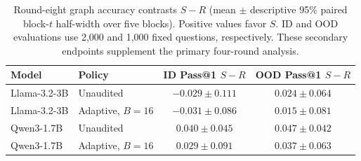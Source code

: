 \begin{table}[H]
\caption{Round-eight graph accuracy contrasts $S-R$ (mean $\pm$ descriptive 95\% paired block-$t$ half-width over five blocks). Positive values favor $S$. ID and OOD evaluations use 2,000 and 1,000 fixed questions, respectively. These secondary endpoints supplement the primary four-round analysis.}
\label{tab:eight-round-contrasts}
\centering\small
\begin{tabular}{@{}llcc@{}}
\toprule
Model & Policy & ID Pass@1 $S-R$ & OOD Pass@1 $S-R$\\
\midrule
Llama-3.2-3B & Unaudited & $-0.029\pm0.111$ & $0.024\pm0.064$\\
Llama-3.2-3B & Adaptive, $B=16$ & $-0.031\pm0.086$ & $0.015\pm0.081$\\
Qwen3-1.7B & Unaudited & $0.040\pm0.045$ & $0.047\pm0.042$\\
Qwen3-1.7B & Adaptive, $B=16$ & $0.029\pm0.091$ & $0.037\pm0.063$\\
\bottomrule
\end{tabular}
\end{table}
